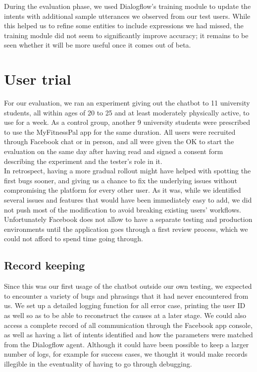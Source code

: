During the evaluation phase, we used Dialogflow's training module to update the intents with additional sample utterances we observed from our test users. While this helped us to refine some entities to include expressions we had missed, the training module did not seem to significantly improve accuracy; it remains to be seen whether it will be more useful once it comes out of beta.
\section{User trial}
For our evaluation, we ran an experiment giving out the chatbot to 11 university students, all within ages of 20 to 25 and at least moderately physically active, to use for a week. As a control group, another 9 university students were prescribed to use the MyFitnessPal app for the same duration. All users were recruited through Facebook chat or in person, and all were given the OK to start the evaluation on the same day after having read and signed a consent form describing the experiment and the tester's role in it. \\
In retrospect, having a more gradual rollout might have helped with spotting the first bugs sooner, and giving us a chance to fix the underlying issues without compromising the platform for every other user. As it was, while we identified several issues and features that would have been immediately easy to add, we did not push most of the modification to avoid breaking existing users' workflows. Unfortunately Facebook does not allow to have a separate testing and production environments until the application goes through a first review process, which we could not afford to spend time going through.
\subsection{Record keeping}
Since this was our first usage of the chatbot outside our own testing, we expected to encounter a variety of bugs and phrasings that it had never encountered from us. We set up a detailed logging function for all error case, printing the user ID as well so as to be able to reconstruct the causes at a later stage. We could also access a complete record of all communication through the Facebook app console, as well as having a list of intents identified and how the parameters were matched from the Dialogflow agent. Although it could have been possible to keep a larger number of logs, for example for success cases, we thought it would make records illegible in the eventuality of having to go through debugging.

